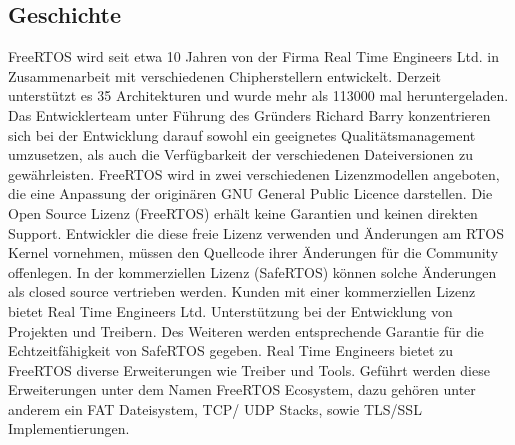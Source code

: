 \subsection{Geschichte}
FreeRTOS wird seit etwa 10 Jahren von der Firma Real Time Engineers Ltd. in Zusammenarbeit mit verschiedenen Chipherstellern entwickelt. Derzeit unterstützt es 35 Architekturen und wurde mehr als 113000 mal heruntergeladen. Das Entwicklerteam unter Führung des Gründers Richard Barry konzentrieren sich bei der Entwicklung darauf sowohl ein geeignetes Qualitätsmanagement umzusetzen, als auch die Verfügbarkeit der verschiedenen Dateiversionen zu gewährleisten. FreeRTOS wird in zwei verschiedenen Lizenzmodellen angeboten, die eine Anpassung der originären GNU General Public Licence darstellen. Die Open Source Lizenz (FreeRTOS) erhält keine Garantien und keinen direkten Support. Entwickler die diese freie Lizenz verwenden und Än\-der\-ungen am RTOS Kernel vornehmen, müssen den Quellcode ihrer Än\-der\-ungen für die Community offenlegen. In der kommerziellen Lizenz (SafeRTOS) können solche Änderungen als closed source vertrieben werden. Kunden mit einer kommerziellen Lizenz bietet Real Time Engineers Ltd. Unterstützung bei der Entwicklung von Projekten und Treibern. Des Weiteren werden entsprechende Garantie für die Echt\-zeit\-fähig\-keit von SafeRTOS gegeben. Real Time Engineers bietet zu FreeRTOS diverse Erweiterungen wie Treiber und Tools. Geführt werden diese Erweiterungen unter dem Namen FreeRTOS Ecosystem, dazu gehören unter anderem ein FAT Dateisystem, TCP/ UDP Stacks, sowie TLS/SSL Implementierungen. 